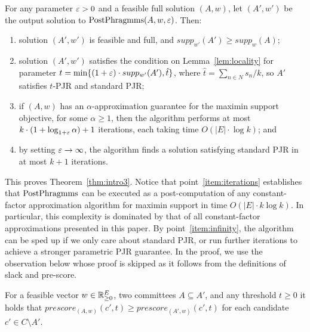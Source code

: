 \begin{theorem}\label{thm:enabler}
For any parameter $\varepsilon>0$ and a feasible full solution $(A,w)$, let $(A',w')$ be the output solution to $\operatorname{PostPhragmms}(A,w,\varepsilon)$. Then: 
\begin{enumerate}
    \item solution $(A',w')$ is feasible and full, and $supp_{w'}(A')\geq supp_w(A)$; \label{item:support}
    \item solution $(A', w')$ satisfies the condition on Lemma~\ref{lem:locality} for parameter $t=\min\{(1+\varepsilon)\cdot supp_{w'}(A'), \hat{t}\}$, where $\hat{t}=\sum_{n\in N} s_n / k$, so $A'$ satisfies $t$-PJR and standard PJR; 
		\label{item:tPJR}
		\item if $(A,w)$ has an $\alpha$-approximation guarantee for the maximin support objective, for some $\alpha\geq 1$, then the algorithm performs at most $k\cdot (1+\log_{1+\varepsilon} \alpha)+1$ iterations, each taking time $O(|E|\cdot \log k)$; and \label{item:iterations}
		\item by setting $\varepsilon\rightarrow\infty$, the algorithm finds a solution satisfying standard PJR in at most $k+1$ iterations. \label{item:infinity}

\end{enumerate}
\end{theorem}

This proves Theorem~\ref{thm:intro3}. 
Notice that point~\ref{item:iterations} establishes that $\operatorname{PostPhragmms}$ can be executed as a post-computation of any constant-factor approximation algorithm for maximin support in time $O(|E|\cdot k\log k)$. In particular, this complexity is dominated by that of all constant-factor approximations presented in this paper.
By point~\ref{item:infinity}, the algorithm can be sped up if we only care about standard PJR, or run further iterations to achieve a stronger parametric PJR guarantee. 
In the proof, we use the observation below whose proof is skipped as it follows from the definitions of slack and pre-score.

\begin{lemma}\label{lem:sameweight}
For a feasible vector $w\in \mathbb{R}_{\geq 0}^E$, two committees $A\subseteq A'$, and any threshold $t\geq 0$ it holds that $prescore_{(A,w)}(c',t)\geq prescore_{(A',w)}(c',t)$ for each candidate $c'\in C\setminus A'$.
\end{lemma}


